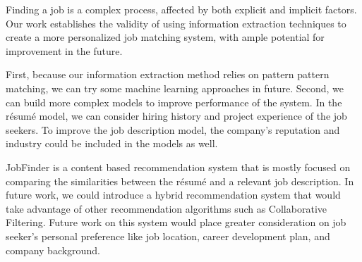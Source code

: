 Finding a job is a complex process, affected by both explicit and implicit factors. Our work establishes the validity of using information extraction techniques to create a more personalized job matching system, with ample potential for improvement in the future.

First, because our information extraction method relies on pattern pattern matching, we can try some machine learning approaches in future. Second, we can build more complex models to improve performance of the system. In the r\'esum\'e model, we can consider hiring history and project experience of the job seekers. To improve the job description model, the company's reputation and industry could be included in the models as well.

JobFinder is a content based recommendation system that is mostly focused on comparing the similarities between the r\'esum\'e and a relevant job description. In future work, we could introduce a hybrid recommendation system that would take advantage of other recommendation algorithms such as Collaborative Filtering. Future work on this system would place greater consideration on job seeker's personal preference like job location, career development plan, and company background.
